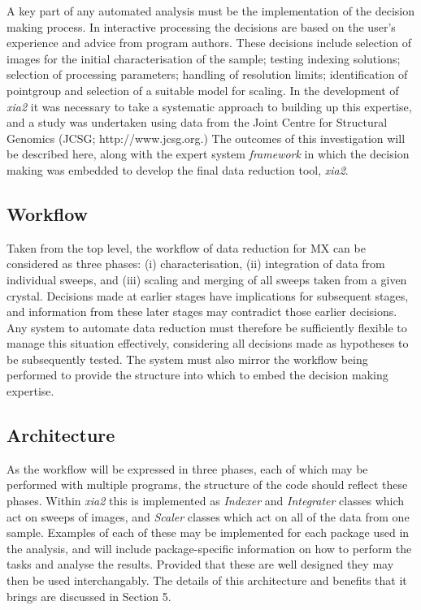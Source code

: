 \documentclass[a4paper, 11pt]{article}
\begin{document}
A key part of any automated analysis must be the implementation of the
decision making process. In interactive processing the decisions are
based on the user's experience and advice from program authors. These
decisions include selection of images for the initial characterisation
of the sample; testing indexing solutions; selection of processing
parameters; handling of resolution limits; identification of pointgroup and
selection of a suitable model for scaling. In the development of
\emph{xia2} it was necessary to take a systematic approach to building
up this expertise, and a study was undertaken using data from the
Joint Centre
for Structural Genomics (JCSG; http://www.jcsg.org.) The
outcomes of this investigation will be described here, along with the
expert system \emph{framework} in which the decision making was
embedded to develop the final data reduction tool, \emph{xia2}.

\subsection{Workflow}

Taken from the top level, the workflow of data reduction for MX
can be considered as three phases:
(i) characterisation, (ii) integration of data from individual sweeps,
and (iii) scaling and merging of all sweeps taken from a given
crystal. Decisions made at earlier stages have implications for
subsequent stages, and information from these later stages may
contradict those earlier decisions. Any system to automate data
reduction must therefore be sufficiently flexible to manage this
situation effectively, considering all decisions made as hypotheses
to be subsequently tested. The system must also mirror the workflow being
performed to provide the structure into which to embed the decision
making expertise.

\subsection{Architecture}

As the workflow will be expressed in three phases, each of which may
be performed with multiple programs, the structure of the code should
reflect these phases. Within \emph{xia2} this is implemented as
\emph{Indexer} and \emph{Integrater} classes which act on sweeps of
images, and \emph{Scaler} classes which act on all of the data from
one sample. Examples of each of these may be implemented for each
package used in the analysis, and will include package-specific
information on how to perform the tasks and analyse the
results. Provided that these are well designed they may then be used
interchangably. The details of this architecture and benefits that it
brings are discussed in Section 5.
\end{document}
